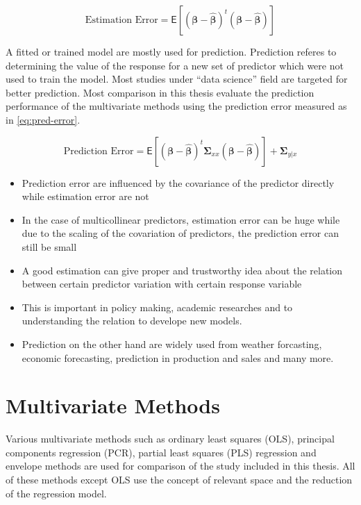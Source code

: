 \documentclass[11pt,twoside,openright,titlepage,
  headinclude,footinclude,BCOR=5mm,
  numbers=noenddot,cleardoublepage=empty,
  tablecaptionabove, dottedtoc,
  bibliography=totoc]{scrreprt}
\providecommand{\tightlist}{%
  \setlength{\itemsep}{0pt}\setlength{\parskip}{0pt}}
\begin{document}
\begin{equation}
\text{Estimation Error} = \mathsf{E}\left[
  \left(\boldsymbol{\beta} - \hat{\boldsymbol{\beta}}\right)^t 
  \left(\boldsymbol{\beta} - \hat{\boldsymbol{\beta}}\right)
\right]
\label{eq:est-error}
\end{equation}

A fitted or trained model are mostly used for prediction. Prediction referes to determining the value of the response for a new set of predictor which were not used to train the model. Most studies under ``data science'' field are targeted for better prediction. Most comparison in this thesis evaluate the prediction performance of the multivariate methods using the prediction error measured as in \eqref{eq:pred-error}.

\begin{equation}
\text{Prediction Error} = \mathsf{E}\left[
  \left(\boldsymbol{\beta} - \hat{\boldsymbol{\beta}}\right)^t
  \boldsymbol{\Sigma}_{xx}
  \left(\boldsymbol{\beta} - \hat{\boldsymbol{\beta}}\right)
\right] + \boldsymbol{\Sigma}_{y|x}
\label{eq:pred-error}
\end{equation}

\begin{itemize}
\tightlist
\item
  Prediction error are influenced by the covariance of the predictor directly while estimation error are not
\item
  In the case of multicollinear predictors, estimation error can be huge while due to the scaling of the covariation of predictors, the prediction error can still be small
\item
  A good estimation can give proper and trustworthy idea about the relation between certain predictor variation with certain response variable
\item
  This is important in policy making, academic researches and to understanding the relation to develope new models.
\item
  Prediction on the other hand are widely used from weather forcasting, economic forecasting, prediction in production and sales and many more.
\end{itemize}

\hypertarget{multivariate-methods}{%
\section{Multivariate Methods}\label{multivariate-methods}}

Various multivariate methods such as ordinary least squares (OLS), principal components regression (PCR), partial least squares (PLS) regression and envelope methods are used for comparison of the study included in this thesis. All of these methods except OLS use the concept of relevant space and the reduction of the regression model.
\end{document}
